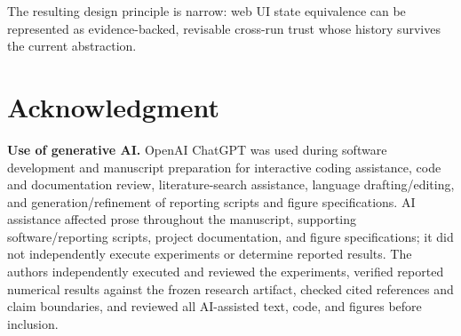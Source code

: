 \documentclass[conference]{IEEEtran}
\begin{document}
The resulting design principle is narrow: web UI state equivalence can be represented as evidence-backed, revisable cross-run trust whose history survives the current abstraction.

\section*{Acknowledgment}
\textbf{Use of generative AI.} OpenAI ChatGPT was used during software development and manuscript preparation for interactive coding assistance, code and documentation review, literature-search assistance, language drafting/editing, and generation/refinement of reporting scripts and figure specifications. AI assistance affected prose throughout the manuscript, supporting software/reporting scripts, project documentation, and figure specifications; it did not independently execute experiments or determine reported results. The authors independently executed and reviewed the experiments, verified reported numerical results against the frozen research artifact, checked cited references and claim boundaries, and reviewed all AI-assisted text, code, and figures before inclusion.



\end{document}
